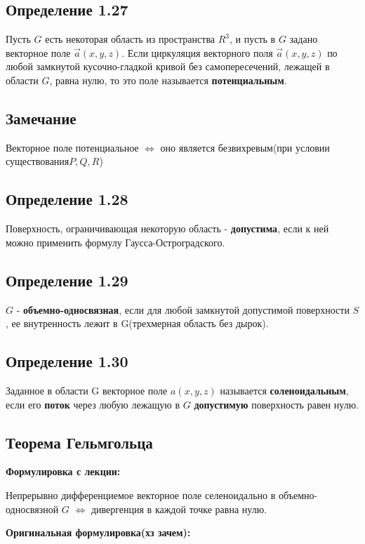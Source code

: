 \documentclass[12pt]{article}
\begin{document}
\subsection{Определение 1.27}
Пусть $G$ есть некоторая область из пространства $R^3$, и пусть в $G$ задано
векторное поле $\vec{a}(x, y, z).$
Если циркуляция векторного поля $\vec{a}(x, y, z)$ по любой замкнутой кусочно-гладкой кривой без самопересечений, лежащей в области $G$, равна нулю, то это поле называется \textbf{потенциальным}.

\subsection{Замечание}
	Векторное поле потенциальное $\Leftrightarrow$ оно является безвихревым(при условии существования$ P, Q, R$)
	
	
\subsection{Определение 1.28}	
	Поверхность, ограничивающая некоторую область - \textbf{допустима}, если к ней можно применить формулу Гаусса-Остроградского.
	
\subsection{Определение 1.29}
	$G$ - \textbf{объемно-односвязная}, если для любой замкнутой допустимой поверхности $S$, ее внутренность лежит в G(трехмерная область без дырок).
	
\subsection{Определение 1.30}
Заданное в области G векторное поле $a(x, y, z)$ называется \textbf{соленоидальным}, если его \textbf{поток} через любую лежащую в $G$ \textbf{допустимую} поверхность равен нулю.	
	
\subsection{Теорема	Гельмгольца}
	\par \textbf{Формулировка с лекции:}
	
		Непрерывно дифференциемое векторное поле селеноидально в объемно-односвязной $G$ $\Leftrightarrow$ дивергенция в каждой точке 		равна нулю.
	
	\par \textbf{Оригинальная формулировка(хз зачем):}
	
\end{document}
